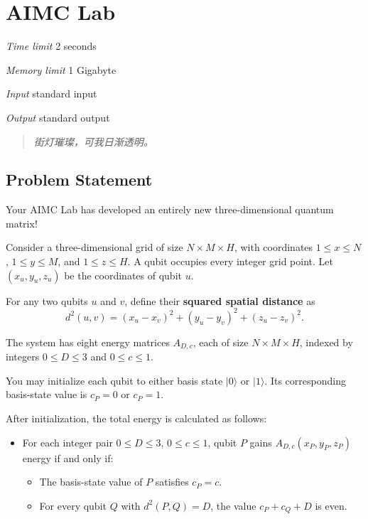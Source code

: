 \section[B. AIMC Lab]{ AIMC Lab}

\textit{Time limit}   2 seconds

\textit{Memory limit} 1 Gigabyte

\textit{Input} \qquad standard input

\textit{Output} \qquad standard output


\begin{quote}
	\textit{街灯璀璨，可我日渐透明。}
\end{quote}

\subsection{Problem Statement}

Your AIMC Lab has developed an entirely new three-dimensional quantum matrix!

Consider a three-dimensional grid of size $N \times M \times H$, with coordinates $1 \le x \le N$, $1 \le y \le M$, and $1 \le z \le H$. A qubit occupies every integer grid point. Let $(x_u,y_u,z_u)$ be the coordinates of qubit $u$.

For any two qubits $u$ and $v$, define their \textbf{squared spatial distance} as
$$
d^2(u, v) = (x_u - x_v)^2 + (y_u - y_v)^2 + (z_u - z_v)^2.
$$

The system has eight energy matrices $A_{D,c}$, each of size $N \times M \times H$, indexed by integers $0 \le D \le 3$ and $0 \le c \le 1$.

You may initialize each qubit to either basis state $|0\rangle$ or $|1\rangle$. Its corresponding basis-state value is $c_P=0$ or $c_P=1$.

After initialization, the total energy is calculated as follows:

\begin{itemize}
	\item For each integer pair $0 \le D \le 3$, $0 \le c \le 1$, qubit $P$ gains $A_{D,c}(x_P,y_P,z_P)$ energy if and only if:
	\begin{itemize}
		\item The basis-state value of $P$ satisfies $c_P=c$.
		\item For every qubit $Q$ with $d^2(P,Q)=D$, the value $c_P+c_Q+D$ is even.
	\end{itemize}
\end{itemize}


